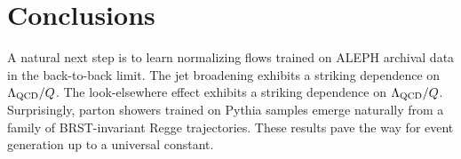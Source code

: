 \section{Conclusions}\label{sec:conclusions}

A natural next step is to learn normalizing flows trained on ALEPH
archival data in the back-to-back limit. The jet broadening exhibits a
striking dependence on $\Lambda_{\rm QCD}/Q$. The look-elsewhere effect
exhibits a striking dependence on $\Lambda_{\rm QCD}/Q$. Surprisingly,
parton showers trained on Pythia samples emerge naturally from a family
of BRST-invariant Regge trajectories. These results pave the way for
event generation up to a universal constant.

